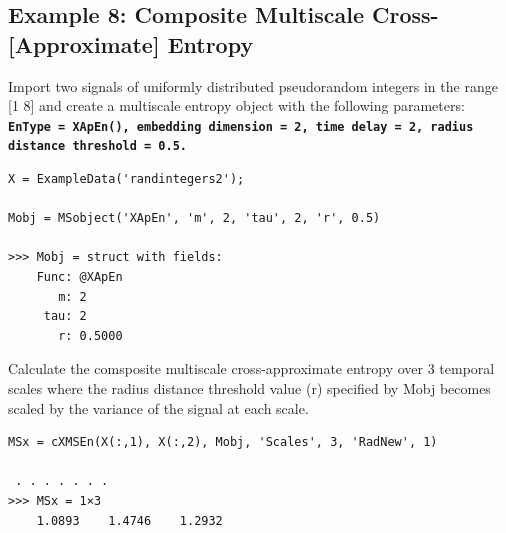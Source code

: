 \documentclass[12pt, a4paper, titlepage, openany]{book}
\begin{document}
\subsection{\normalsize Example 8: \hspace{15mm}Composite Multiscale Cross-[Approximate] Entropy}
\noindent Import two signals of uniformly distributed pseudorandom integers in the range [1 8] and create a multiscale entropy object with the following parameters:\\
\texttt{\textbf{EnType =  XApEn(), embedding dimension = 2, time delay = 2, radius distance threshold = 0.5.}}
\begin{verbatim}
X = ExampleData('randintegers2');

Mobj = MSobject('XApEn', 'm', 2, 'tau', 2, 'r', 0.5)

>>> Mobj = struct with fields:
    Func: @XApEn
       m: 2
     tau: 2
       r: 0.5000
\end{verbatim}
Calculate the comsposite multiscale cross-approximate entropy over 3 temporal scales where the radius distance threshold value (r) specified by Mobj becomes scaled by the variance of the signal at each scale.
\begin{verbatim}
MSx = cXMSEn(X(:,1), X(:,2), Mobj, 'Scales', 3, 'RadNew', 1)

 . . . . . . .
>>> MSx = 1×3
    1.0893    1.4746    1.2932

\end{verbatim}




\newpage
\end{document}

